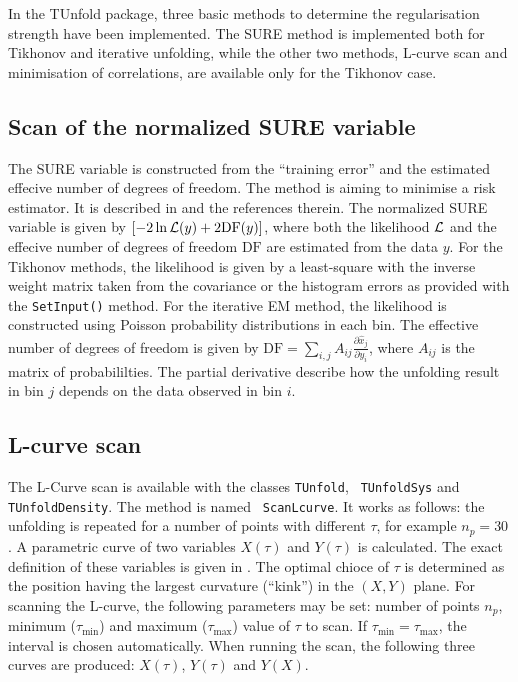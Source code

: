 \documentclass[12pt]{article}
\begin{document}
In the TUnfold package, three basic methods to determine the
regularisation strength have been implemented. The SURE method is
implemented both for Tikhonov and iterative unfolding, while the other
two methods, L-curve scan and minimisation of correlations, are
available only for the Tikhonov case.

\subsection{Scan of the normalized SURE variable}

The SURE variable is constructed from the ``training error'' and the
estimated effecive number of degrees of freedom. The method is aiming
to minimise a risk estimator. It is described in \cite{SURE} and the
references therein. 
The normalized SURE variable is given by $[-2\ln {\cal
  L}(y)+2\mathrm{DF}(y)]$, where both the likelihood $\cal L$ and the effecive
number of degrees of freedom $\mathrm{DF}$ are estimated from the data $y$.
For the Tikhonov methods, the likelihood is given by a least-square
with the inverse weight matrix taken from the covariance or the histogram
errors as provided with the
{\tt SetInput()} method. For the iterative EM method, the likelihood
is constructed using Poisson probability distributions in each bin.
The effective number of degrees of freedom is given by
$\mathrm{DF}=\sum_{i,j} A_{ij}\frac{\partial
  \hat{x}_j}{\partial y_i}$, where $A_{ij}$ is the matrix of
probabililties. The partial derivative describe how the unfolding
result in bin $j$ depends on the data observed in bin $i$.

\subsection{L-curve scan}

The L-Curve scan is available with the classes {\tt TUnfold}, {\tt
  TUnfoldSys} and {\tt TUnfoldDensity}. The method is named {\tt
  ScanLcurve}. It works as follows: the unfolding is repeated for a
number of points with different $\tau$, 
for example $n_p=30$. A parametric curve of two
variables $X(\tau)$ and $Y(\tau)$ is calculated.
The exact definition of these variables is given in 
\cite{Schmitt:2012kp}. The optimal chioce of $\tau$ is 
determined as the position having the largest curvature (``kink'') in
the $(X,Y)$ plane.
For scanning the L-curve, the following parameters may be set: number
of points $n_p$, minimum ($\tau_{\min{}}$) and maximum
($\tau_{\max{}}$) value of $\tau$ to scan. If
$\tau_{\min{}}=\tau_{\max{}}$, the interval is chosen
automatically. When running the scan, the following three curves are
produced: $X(\tau)$, $Y(\tau)$ and $Y(X)$.
\end{document}

